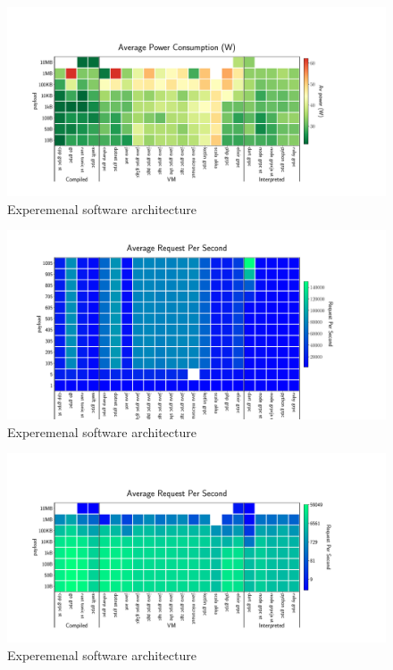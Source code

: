 \begin{figure}[!hbt]
    \begin{center}
        \includegraphics[width=1.2\linewidth]{imgs/rpc_images/power_consumption_payload}
    \end{center}
    \caption{Experemenal software architecture}\label{fig:power_consumption_payload}
\end{figure}

\begin{figure}[!hbt]
    \begin{center}
        \includegraphics[width=1.2\linewidth]{imgs/rpc_images/rps_clients}
    \end{center}
    \caption{Experemenal software architecture}\label{fig:rps_clients}
\end{figure}

\begin{figure}[!hbt]
    \begin{center}
        \includegraphics[width=1.2\linewidth]{imgs/rpc_images/rps_payload}
    \end{center}
    \caption{Experemenal software architecture}\label{fig:rps_payload}
\end{figure}



